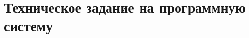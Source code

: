 \documentclass[../nirs.tex]{subfiles}
\begin{document}
    \chapter{Техническое задание на программную систему}
    
\end{document}
